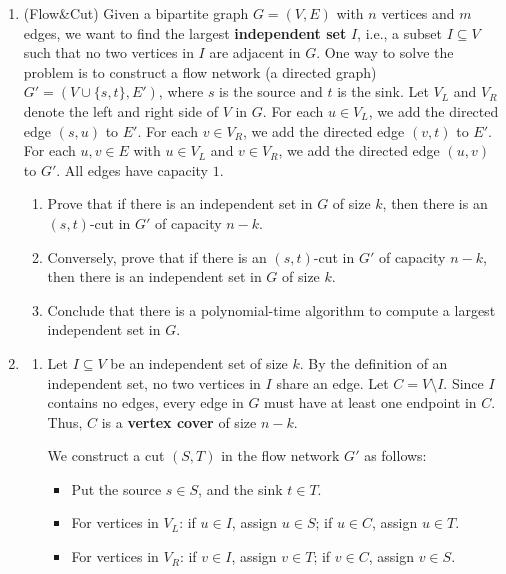 \documentclass[12pt,a4paper]{article}
\makeatletter
\newtheorem*{solution}{Solution}
\theoremstyle{definition}
\renewenvironment{solution}[1][Solution] {\par\pushQED{\qed}\normalfont\topsep6\p@\@plus6\p@\relax\trivlist\item[\hskip\labelsep\bfseries#1\@addpunct{.}]\ignorespaces}{\popQED\endtrivlist\@endpefalse} \makeatother
\makeatother
\begin{document}
\begin{enumerate}
    \item {\color{purple}(Flow\&Cut)} Given a bipartite graph $G = (V, E)$ with $n$ vertices and $m$ edges, we want to find the largest \textbf{independent set} $I$, i.e., a subset $I \subseteq V$ such that no two vertices in $I$ are adjacent in $G$. One way to solve the problem is to construct a flow network (a directed graph) $G′ = (V \cup\{s, t\}, E')$, where $s$ is the source and $t$ is the sink. Let $V_L$ and $V_R$ denote the left and right side of $V$ in $G$. For each $u \in V_L$, we add the directed edge $(s, u)$ to $E'$. For each $v \in V_R$, we add the directed edge $(v, t)$ to $E'$. For each $u,v \in E$ with $u \in V_L$ and $v \in V_R$, we add the directed edge $(u, v)$ to $G'$. All edges have capacity $1$. 
    \begin{enumerate}
        \item Prove that if there is an independent set in $G$ of size $k$, then there is an $(s, t)$-cut in $G'$ of capacity $n − k$.
        \item Conversely, prove that if there is an $(s, t)$-cut in $G'$ of capacity $n−k$, then there is an independent set in $G$ of size $k$.
        \item Conclude that there is a polynomial-time algorithm to compute a largest independent set in $G$.
    \end{enumerate}

    \begin{solution}
        \begin{enumerate}
    \item     
    Let $I \subseteq V$ be an independent set of size $k$. By the definition of an independent set, no two vertices in $I$ share an edge. 
    Let $C = V \setminus I$. Since $I$ contains no edges, every edge in $G$ must have at least one endpoint in $C$. Thus, $C$ is a \textbf{vertex cover} of size $n - k$.
    
    We construct a cut $(S, T)$ in the flow network $G'$ as follows:
    \begin{itemize}
        \item Put the source $s \in S$, and the sink $t \in T$.
        \item For vertices in $V_L$: if $u \in I$, assign $u \in S$; if $u \in C$, assign $u \in T$.
        \item For vertices in $V_R$: if $v \in I$, assign $v \in T$; if $v \in C$, assign $v \in S$.
    \end{itemize}
    

\end{enumerate}
\end{solution}
\end{enumerate}
\end{document}

